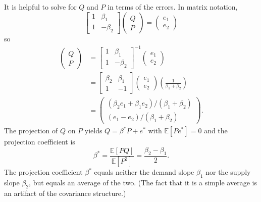 \documentclass[10pt]{article}
\begin{document}
It is helpful to solve for $Q$ and $P$ in terms of the errors. In matrix notation,
$$
\left[\begin{array}{cc}
1 & \beta_{1} \\
1 & -\beta_{2}
\end{array}\right]\left(\begin{array}{l}
Q \\
P
\end{array}\right)=\left(\begin{array}{l}
e_{1} \\
e_{2}
\end{array}\right)
$$
so
$$
\begin{aligned}
\left(\begin{array}{l}
Q \\
P
\end{array}\right) &=\left[\begin{array}{cc}
1 & \beta_{1} \\
1 & -\beta_{2}
\end{array}\right]^{-1}\left(\begin{array}{c}
e_{1} \\
e_{2}
\end{array}\right) \\
&=\left[\begin{array}{cc}
\beta_{2} & \beta_{1} \\
1 & -1
\end{array}\right]\left(\begin{array}{l}
e_{1} \\
e_{2}
\end{array}\right)\left(\frac{1}{\beta_{1}+\beta_{2}}\right) \\
&=\left(\begin{array}{c}
\left(\beta_{2} e_{1}+\beta_{1} e_{2}\right) /\left(\beta_{1}+\beta_{2}\right) \\
\left(e_{1}-e_{2}\right) /\left(\beta_{1}+\beta_{2}\right)
\end{array}\right) .
\end{aligned}
$$
The projection of $Q$ on $P$ yields $Q=\beta^{*} P+e^{*}$ with $\mathbb{E}\left[P e^{*}\right]=0$ and the projection coefficient is
$$
\beta^{*}=\frac{\mathbb{E}[P Q]}{\mathbb{E}\left[P^{2}\right]}=\frac{\beta_{2}-\beta_{1}}{2} .
$$
The projection coefficient $\beta^{*}$ equals neither the demand slope $\beta_{1}$ nor the supply slope $\beta_{2}$, but equals an average of the two. (The fact that it is a simple average is an artifact of the covariance structure.)
\end{document}
